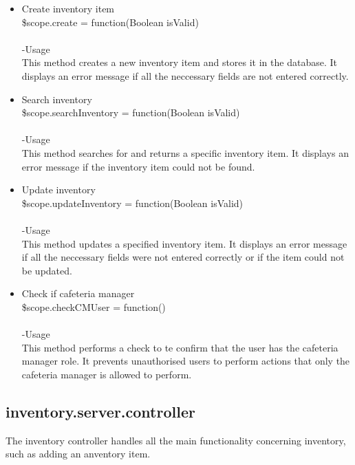 \documentclass[a4paper,12pt]{report}
\begin{document}
\begin{enumerate}
\begin{itemize}
   \item Create inventory item\\ 
    \$scope.create = function(Boolean isValid)\\ \\
    -Usage\\
    This method creates a new inventory item and stores it in the database. It displays an error message if all the neccessary fields are not entered correctly. 
    \item Search inventory\\
     \$scope.searchInventory = function(Boolean isValid)\\ \\
     -Usage\\
     This method searches for and returns a specific inventory item. It displays an error message if the inventory item could not be found.
     \item Update inventory\\
      \$scope.updateInventory = function(Boolean isValid)\\ \\
      -Usage\\
      This method updates a specified inventory item. It displays an error message if all the neccessary fields were not entered correctly or if the item could not be updated.
      \item Check if cafeteria manager\\
       \$scope.checkCMUser = function()\\ \\
       -Usage\\
       This method performs a check to te confirm that the user has the cafeteria manager role. It prevents unauthorised users to perform actions that only the cafeteria manager is allowed to perform.
	\end{itemize}
\end{enumerate}
\subsection{inventory.server.controller}
 The inventory controller handles all the main functionality concerning inventory, such as adding an anventory item.
 
\end{document}
